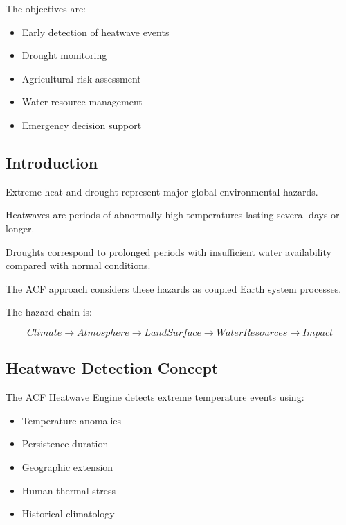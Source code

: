 The objectives are:

\begin{itemize}

\item Early detection of heatwave events

\item Drought monitoring

\item Agricultural risk assessment

\item Water resource management

\item Emergency decision support

\end{itemize}



\subsection{Introduction}

Extreme heat and drought represent major global environmental hazards.

Heatwaves are periods of abnormally high temperatures lasting several
days or longer.

Droughts correspond to prolonged periods with insufficient water
availability compared with normal conditions.


The ACF approach considers these hazards as coupled Earth system
processes.


The hazard chain is:

\[
Climate
\rightarrow
Atmosphere
\rightarrow
Land Surface
\rightarrow
Water Resources
\rightarrow
Impact
\]



\subsection{Heatwave Detection Concept}

The ACF Heatwave Engine detects extreme temperature events using:

\begin{itemize}

\item Temperature anomalies

\item Persistence duration

\item Geographic extension

\item Human thermal stress

\item Historical climatology

\end{itemize}


